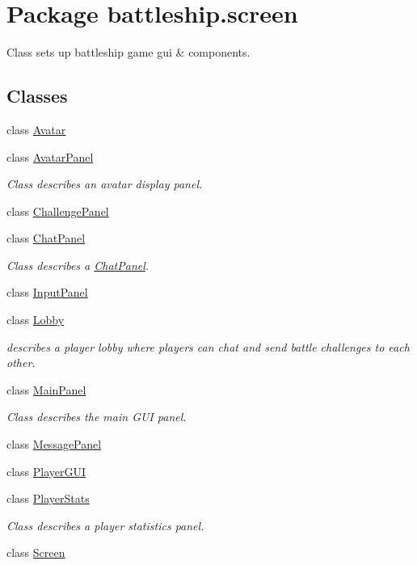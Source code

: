 \hypertarget{namespacebattleship_1_1screen}{}\section{Package battleship.\+screen}
\label{namespacebattleship_1_1screen}


Class sets up battleship game gui \& components.  


\subsection*{Classes}
\begin{DoxyCompactItemize}
\item 
class \hyperlink{classbattleship_1_1screen_1_1Avatar}{Avatar}
\item 
class \hyperlink{classbattleship_1_1screen_1_1AvatarPanel}{Avatar\+Panel}
\begin{DoxyCompactList}\small\item\em Class describes an avatar display panel. \end{DoxyCompactList}\item 
class \hyperlink{classbattleship_1_1screen_1_1ChallengePanel}{Challenge\+Panel}
\item 
class \hyperlink{classbattleship_1_1screen_1_1ChatPanel}{Chat\+Panel}
\begin{DoxyCompactList}\small\item\em Class describes a \hyperlink{classbattleship_1_1screen_1_1ChatPanel}{Chat\+Panel}. \end{DoxyCompactList}\item 
class \hyperlink{classbattleship_1_1screen_1_1InputPanel}{Input\+Panel}
\item 
class \hyperlink{classbattleship_1_1screen_1_1Lobby}{Lobby}
\begin{DoxyCompactList}\small\item\em describes a player lobby where players can chat and send battle challenges to each other. \end{DoxyCompactList}\item 
class \hyperlink{classbattleship_1_1screen_1_1MainPanel}{Main\+Panel}
\begin{DoxyCompactList}\small\item\em Class describes the main G\+U\+I panel. \end{DoxyCompactList}\item 
class \hyperlink{classbattleship_1_1screen_1_1MessagePanel}{Message\+Panel}
\item 
class \hyperlink{classbattleship_1_1screen_1_1PlayerGUI}{Player\+G\+U\+I}
\item 
class \hyperlink{classbattleship_1_1screen_1_1PlayerStats}{Player\+Stats}
\begin{DoxyCompactList}\small\item\em Class describes a player statistics panel. \end{DoxyCompactList}\item 
class \hyperlink{classbattleship_1_1screen_1_1Screen}{Screen}
\end{DoxyCompactItemize}


